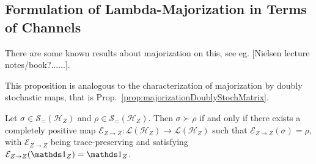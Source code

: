 \documentclass[12pt,a4paper]{article}
\def\Hs{\mathscr{H}}%
\newcommand{\LOps}{\mathscr{L}}
\newcommand{\DOps}{\mathscr{S}_=}
\begin{document}
\subsection{Formulation of Lambda-Majorization in Terms of Channels}

There are some known results about majorization on this, see eg. [Nielsen lecture notes/book?......].

This proposition is analogous to the characterization of majorization by doubly stochastic maps, that
is Prop.~\ref{prop:majorizationDoublyStochMatrix}.
\begin{prop}
  \label{prop:MajorizationUnitalCPM}
  Let $\sigma\in\DOps(\Hs_Z)$ and $\rho\in\DOps(\Hs_Z)$. Then $\sigma\succ\rho$ if and only if
  there exists a completely positive map $\mathcal{E}_{Z\rightarrow Z} : \LOps(\Hs_Z)\rightarrow\LOps(\Hs_Z)$
  such that $\mathcal{E}_{Z\rightarrow Z}(\sigma) = \rho$, with $\mathcal{E}_{Z\rightarrow Z}$ being
  trace-preserving and satisfying $\mathcal{E}_{Z\rightarrow Z}(\Ident_Z) = \Ident_Z$.
\end{prop}
\end{document}
